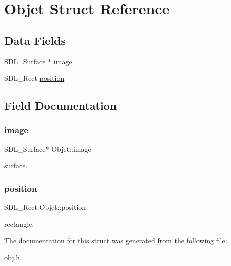 \hypertarget{structObjet}{}\section{Objet Struct Reference}
\label{structObjet}
\subsection*{Data Fields}
\begin{DoxyCompactItemize}
\item 
S\+D\+L\+\_\+\+Surface $\ast$ \hyperlink{structObjet_adc26449d5051fc613b8972a08a3e7bba}{image}
\item 
S\+D\+L\+\_\+\+Rect \hyperlink{structObjet_a92fd979dc6d37621933bf051914da800}{position}
\end{DoxyCompactItemize}


\subsection{Field Documentation}
\mbox{\label{structObjet_adc26449d5051fc613b8972a08a3e7bba}} 
\subsubsection{\texorpdfstring{image}{image}}
{\footnotesize\ttfamily S\+D\+L\+\_\+\+Surface$\ast$ Objet\+::image}

surface. \mbox{\label{structObjet_a92fd979dc6d37621933bf051914da800}} 
\subsubsection{\texorpdfstring{position}{position}}
{\footnotesize\ttfamily S\+D\+L\+\_\+\+Rect Objet\+::position}

rectangle. 

The documentation for this struct was generated from the following file\+:\begin{DoxyCompactItemize}
\item 
\hyperlink{obj_8h}{obj.\+h}\end{DoxyCompactItemize}
